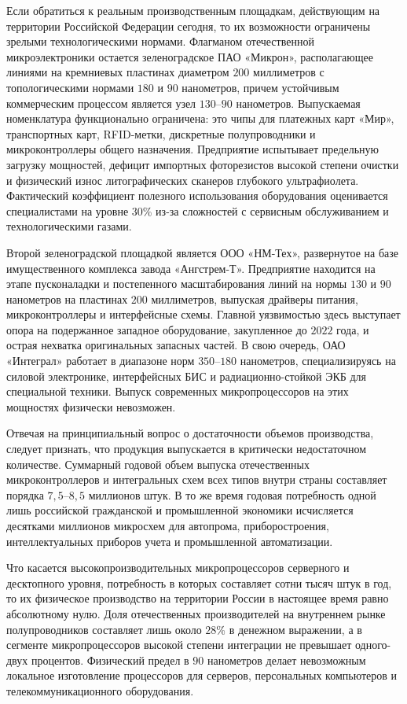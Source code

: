 \documentclass[12pt,a4paper]{article}
\begin{document}
Если обратиться к реальным производственным площадкам, действующим 
на территории Российской Федерации сегодня, то их возможности 
ограничены зрелыми технологическими нормами. Флагманом отечественной 
микроэлектроники остается зеленоградское ПАО «Микрон», располагающее 
линиями на кремниевых пластинах диаметром $200$ миллиметров с 
топологическими нормами $180$ и $90$ нанометров, причем устойчивым 
коммерческим процессом является узел $130$--$90$ нанометров. Выпускаемая 
номенклатура функционально ограничена: это чипы для платежных карт 
«Мир», транспортных карт, RFID-метки, дискретные полупроводники и 
микроконтроллеры общего назначения. Предприятие испытывает предельную 
загрузку мощностей, дефицит импортных фоторезистов высокой степени 
очистки и физический износ литографических сканеров глубокого 
ультрафиолета. Фактический коэффициент полезного использования 
оборудования оценивается специалистами на уровне $30$\% из-за 
сложностей с сервисным обслуживанием и технологическими газами.

Второй зеленоградской площадкой является ООО «НМ-Тех», развернутое 
на базе имущественного комплекса завода «Ангстрем-Т». Предприятие 
находится на этапе пусконаладки и постепенного масштабирования 
линий на нормы $130$ и $90$ нанометров на пластинах $200$ миллиметров, 
выпуская драйверы питания, микроконтроллеры и интерфейсные схемы. 
Главной уязвимостью здесь выступает опора на подержанное западное 
оборудование, закупленное до $2022$ года, и острая нехватка оригинальных 
запасных частей. В свою очередь, ОАО «Интеграл» работает в 
диапазоне норм $350$--$180$ нанометров, специализируясь на силовой 
электронике, интерфейсных БИС и радиационно-стойкой ЭКБ для 
специальной техники. Выпуск современных микропроцессоров на этих 
мощностях физически невозможен.

Отвечая на принципиальный вопрос о достаточности объемов производства, 
следует признать, что продукция выпускается в критически недостаточном 
количестве. Суммарный годовой объем выпуска отечественных 
микроконтроллеров и интегральных схем всех типов внутри страны 
составляет порядка $7,5$--$8,5$ миллионов штук. В то же время годовая 
потребность одной лишь российской гражданской и промышленной 
экономики исчисляется десятками миллионов микросхем для автопрома, 
приборостроения, интеллектуальных приборов учета и промышленной 
автоматизации.

Что касается высокопроизводительных микропроцессоров серверного и 
десктопного уровня, потребность в которых составляет сотни тысяч 
штук в год, то их физическое производство на территории России в 
настоящее время равно абсолютному нулю. Доля отечественных 
производителей на внутреннем рынке полупроводников составляет 
лишь около $28$\% в денежном выражении, а в сегменте микропроцессоров 
высокой степени интеграции не превышает одного-двух процентов. 
Физический предел в $90$ нанометров делает невозможным локальное 
изготовление процессоров для серверов, персональных компьютеров и 
телекоммуникационного оборудования.
\end{document}
